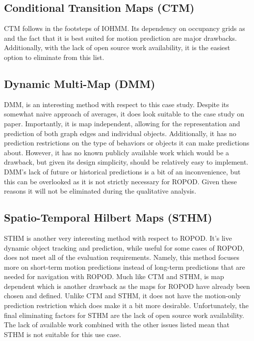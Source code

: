  \subsection { Conditional Transition Maps (CTM) }
  CTM follows in the footsteps of IOHMM. Its dependency on occupancy grids as
  and the fact that it is best suited for motion prediction are major drawbacks.
  Additionally, with the lack of open source work availability, it is the easiest
  option to eliminate from this list. \\

  \subsection { Dynamic Multi-Map (DMM) }
  DMM, is an interesting
  method with respect to this case study. Despite its somewhat naive approach
  of averages, it does look suitable to the case study on paper. Importantly, it is map
  independent, allowing for the representation and prediction of both graph edges and individual
  objects. Additionally, it has no prediction restrictions on the type of
  behaviors or objects it can make predictions about. However, it has no known publicly available
  work which would be a drawback, but given its design simplicity, should
  be relatively easy to implement. DMM's lack of future or historical
  predictions is a bit of an inconvenience, but this can be overlooked as it is not
  strictly necessary for ROPOD. Given these reasons it will not be eliminated
  during the qualitative analysis. \\

  \subsection{ Spatio-Temporal Hilbert Maps (STHM) }
  STHM is another very interesting method with respect to ROPOD.
  It's live dynamic object tracking and prediction, while useful for some
  cases of ROPOD, does not meet all of the evaluation requirements.
  Namely, this method focuses more on short-term motion predictions instead
  of long-term predictions that are needed for navigation with ROPOD.
  Much like CTM and
  STHM, is map dependent which is another drawback as the maps for
  ROPOD have already been chosen and defined. Unlike CTM and STHM, it does not
  have the motion-only prediction restriction which does make it a bit more
  desirable. Unfortunately, the final eliminating factors for STHM are the lack
  of open source work availability. The lack of available work combined with the
  other issues listed mean that STHM is not suitable for this use case. \\


